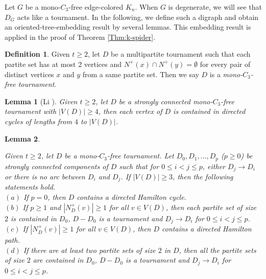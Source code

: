 \documentclass[10pt,a4paper]{article}
\newtheorem{lemma}{Lemma}
\theoremstyle{definition}
\newtheorem{definition}{Definition}
\begin{document}
Let $G$ be a mono-$C_3$-free edge-colored $K_n$. When $G$ is degenerate, we will see that $D_G$ acts like a tournament. In the following, we define such a digraph and obtain an oriented-tree-embedding result by several lemmas. This embedding result is applied in the proof of Theorem \ref{Thm:k-spider}.

\begin{definition}\label{def:monoC3-free-tournament}
    Given $t\geq 2$, let  $D$ be a multipartite tournament such that each partite set has at most 2 vertices and $N^+\left( x \right) \cap N^+\left( y \right) =\emptyset$ for every pair of distinct vertices $x$ and $y$ from a same partite set. Then we say $D$ is a {\it mono-$C_3$-free tournament}.
\end{definition}

\begin{lemma}[Li \cite{li_properly_2021}]\label{Lem:D-cycle}
Given $t\geq2$, let  $D$ be a strongly connected mono-$C_3$-free tournament with $|V(D)|\ge 4$,  then each vertex of $D$ is contained in directed cycles of lengths from $4$ to $|V(D)|$.
\end{lemma}
\begin{lemma}\label{Lem:D-cycle+}

Given $t\geq2$, let  $D$ be a mono-$C_3$-free tournament. Let $D_0,D_1,\ldots,D_p$ ($p\geq 0$) be  strongly  connected components of $D$ such that for $0\leq i<j\leq p$, either $D_j\rightarrow D_i$ or there is no arc between $D_i$ and $D_j$. If $|V(D)|\ge 3$, then the following statements hold.\\
 $(a)$  If $p=0$, then $D$ contains a directed Hamilton cycle.\\
 $(b)$  If $p\geq 1$  and $|N^+_D(v)|\geq 1$ for all $v\in V(D)$, then each partite set of size $2$ is contained in $D_0$, $D-D_0$ is a tournament and $D_j\rightarrow D_i$ for $0\leq i<j\leq p$.\\
 $(c)$ If $|N^+_D(v)|\geq 1$ for all $v\in V(D)$, then $D$ contains a directed Hamilton path.\\
 $(d)$ If there are at least two partite sets of size $2$ in $D$, then all the partite sets of size $2$ are contained in $D_0$, $D-D_0$ is a tournament and $D_j\rightarrow D_i$ for $0\leq i<j\leq p$.
\end{lemma}
\end{document}
